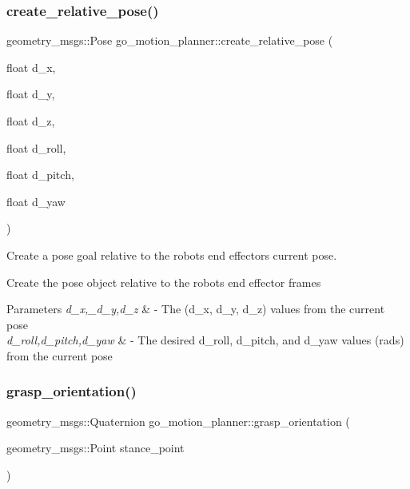 \subsubsection{\texorpdfstring{create\+\_\+relative\+\_\+pose()}{create\_relative\_pose()}}
{\footnotesize\ttfamily geometry\+\_\+msgs\+::\+Pose go\+\_\+motion\+\_\+planner\+::create\+\_\+relative\+\_\+pose (\begin{DoxyParamCaption}\item[{float}]{d\+\_\+x,  }\item[{float}]{d\+\_\+y,  }\item[{float}]{d\+\_\+z,  }\item[{float}]{d\+\_\+roll,  }\item[{float}]{d\+\_\+pitch,  }\item[{float}]{d\+\_\+yaw }\end{DoxyParamCaption})}



Create a pose goal relative to the robot\textquotesingle{}s end effector\textquotesingle{}s current pose. 


\begin{DoxyItemize}
\item Create the pose object relative to the robot\textquotesingle{}s end effector frame\textquotesingle{}s
\end{DoxyItemize}


\begin{DoxyParams}{Parameters}
{\em d\+\_\+x,\+\_\+d\+\_\+y,d\+\_\+z} & -\/ The (d\+\_\+x, d\+\_\+y, d\+\_\+z) values from the current pose \\
\hline
{\em d\+\_\+roll,d\+\_\+pitch,d\+\_\+yaw} & -\/ The desired d\+\_\+roll, d\+\_\+pitch, and d\+\_\+yaw values (rads) from the current pose \\
\hline
\end{DoxyParams}
\mbox{\label{classgo__motion__planner_aa8f5de4110bd29391e00b26eda2a5bcc}} 
\subsubsection{\texorpdfstring{grasp\+\_\+orientation()}{grasp\_orientation()}}
{\footnotesize\ttfamily geometry\+\_\+msgs\+::\+Quaternion go\+\_\+motion\+\_\+planner\+::grasp\+\_\+orientation (\begin{DoxyParamCaption}\item[{geometry\+\_\+msgs\+::\+Point}]{stance\+\_\+point }\end{DoxyParamCaption})}



